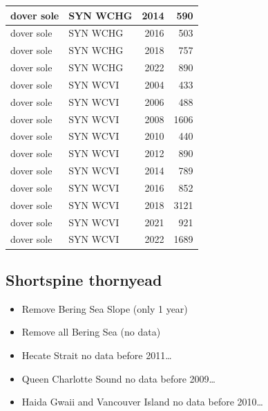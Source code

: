 \documentclass[
  letterpaper,
  DIV=11,
  numbers=noendperiod]{scrartcl}
\begin{document}
\begin{tabular}[t]{l|l|r|r}
dover sole & SYN WCHG & 2014 & 590\\
\hline
dover sole & SYN WCHG & 2016 & 503\\
\hline
dover sole & SYN WCHG & 2018 & 757\\
\hline
dover sole & SYN WCHG & 2022 & 890\\
\hline
dover sole & SYN WCVI & 2004 & 433\\
\hline
dover sole & SYN WCVI & 2006 & 488\\
\hline
dover sole & SYN WCVI & 2008 & 1606\\
\hline
dover sole & SYN WCVI & 2010 & 440\\
\hline
dover sole & SYN WCVI & 2012 & 890\\
\hline
dover sole & SYN WCVI & 2014 & 789\\
\hline
dover sole & SYN WCVI & 2016 & 852\\
\hline
dover sole & SYN WCVI & 2018 & 3121\\
\hline
dover sole & SYN WCVI & 2021 & 921\\
\hline
dover sole & SYN WCVI & 2022 & 1689\\
\hline
\end{tabular}

\subsection{Shortspine thornyead}\label{shortspine-thornyead}

\begin{itemize}
\item
  Remove Bering Sea Slope (only 1 year)
\item
  Remove all Bering Sea (no data)
\item
  Hecate Strait no data before 2011\ldots{}
\item
  Queen Charlotte Sound no data before 2009\ldots{}
\item
  Haida Gwaii and Vancouver Island no data before 2010\ldots{}
\end{itemize}
\end{document}
